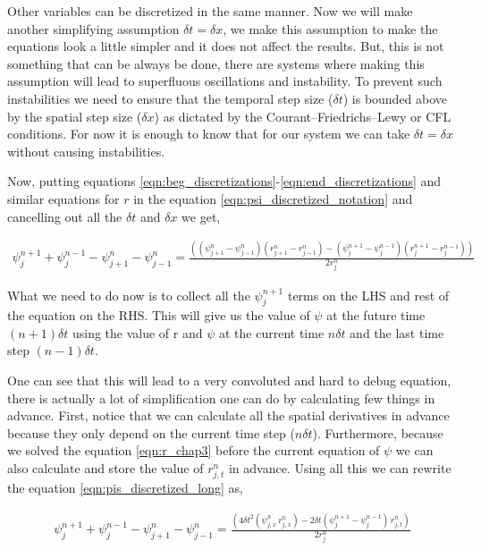 Other variables can be discretized in the same manner. Now we will make another simplifying assumption $\delta t = \delta x$, we make this assumption to make the equations look a little simpler and it does not affect the results. But, this is not something that can be always be done, there are systems where making this assumption will lead to  superfluous oscillations and instability. To prevent such instabilities we need to ensure that the temporal step size ($\delta t$) is bounded above by the spatial step size ($\delta x$) as dictated by the Courant–Friedrichs–Lewy or CFL conditions. For now it is enough to know that for our system we can take $\delta t = \delta x$ without causing instabilities.


Now, putting equations \ref{eqn:beg_discretizations}-\ref{eqn:end_discretizations} and similar equations for $r$ in the equation \ref{eqn:psi_discretized_notation} and cancelling out all the $\delta t$ and $\delta x$ we get,

\begin{multline}
    \psi^{n+1}_{j} + \psi^{n-1}_{j} - \psi^{n}_{j+1} - \psi^{n}_{j-1} = \frac{((\psi^{n}_{j+1} - \psi^{n}_{j-1})(r^{n}_{j+1} - r^{n}_{j-1}) - (\psi^{n+1}_{j} - \psi^{n-1}_{j})(r^{n+1}_{j} - r^{n-1}_{j}))}{2 r^n_j}
    \label{eqn:pis_discretized_long}
\end{multline}

What we need to do now is to collect all the $\psi^{n+1}_j$ terms on the LHS and rest of the equation on the RHS. This will give us the value of $\psi$ at the future time $(n+1) \delta t$ using the value of r and $\psi$ at the current time $n \delta t$ and the last time step $ (n-1) \delta t$.


One can see that this will lead to a very convoluted and hard to debug equation, there is actually a lot of simplification one can do by calculating few things in advance. First, notice that we can calculate all the spatial derivatives in advance because they only depend on the current time step ($n \delta t$). Furthermore, because we solved the equation \ref{eqn:r_chap3} before the current equation of $\psi$ we can also calculate and store the value of $r^n_{j,t}$ in advance. Using all this we can rewrite the equation \ref{eqn:pis_discretized_long} as,


\begin{multline}
    \psi^{n+1}_{j} + \psi^{n-1}_{j} - \psi^{n}_{j+1} - \psi^{n}_{j-1} = \frac{(4\delta t^2 (\psi^{n}_{j,x} \, r^{n}_{j,x}) - 2 \delta t(\psi^{n+1}_{j} - \psi^{n-1}_{j})\,r^{n}_{j,t})}{2 r^n_j}
    \label{eqn:final_psi}
\end{multline}

